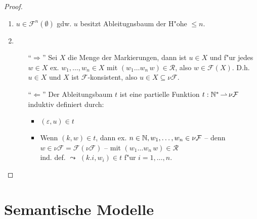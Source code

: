 \documentclass[12pt,a4paper,final]{article}
\begin{document}
\begin{proof} \
  \begin{enumerate}
  \item $u \in \mathcal{F}^n(\emptyset)$ gdw. $u$ besitzt Ableitugnsbaum der H"ohe $\le n$.
  \item 
    \begin{itemize}
    \item[``$\Rightarrow$'']
      Sei $X$ die Menge der Markierungen, dann ist $u \in X$ und f"ur jedes $w \in X$ ex.
      $w_1,\ldots,w_n \in X$ mit $(w_1 \ldots w_n\,w) \in \mathcal{R}$, also
      $w \in \mathcal{F}(X)$. D.h. $u \in X$ und $X$ ist $\mathcal{F}$-konsistent, also
      $u \in X \subseteq \nu \mathcal{F}$.
    \item[``$\Leftarrow$'']
      Der Ableitungsbaum $t$ ist eine partielle Funktion $t: \mathbb N^* \operatorname{\rightharpoonup} \nu\mathcal{F}$ induktiv definiert
      durch:
      \begin{itemize}
      \item $(\varepsilon,u) \in t$
      \item Wenn $(k,w) \in t$, dann ex. $n\in\mathbb N,w_1,\ldots,w_n \in \nu\mathcal{F}$ --
        denn $w \in \nu\mathcal{F} = \mathcal{F}(\nu\mathcal{F})$ -- mit
        $(w_1 \ldots w_n\,w) \in \mathcal{R}$ \\
        ind. def. $\leadsto$ $(k.i,w_i) \in t$ f"ur $i=1,\ldots,n$.
      \end{itemize}
    \end{itemize}
  \end{enumerate}
\end{proof}



\section{Semantische Modelle}
\label{sec:Semantische_Modelle}
\end{document}
